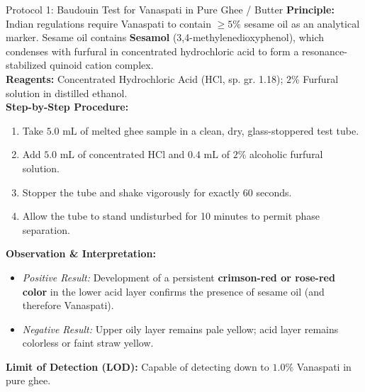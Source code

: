 \documentclass[11pt,a4paper,oneside]{article}
\begin{document}
\begin{protocolbox}{Protocol 1: Baudouin Test for Vanaspati in Pure Ghee / Butter}
\textbf{Principle:} Indian regulations require Vanaspati to contain $\ge 5\%$ sesame oil as an analytical marker. Sesame oil contains \textbf{Sesamol} (3,4-methylenedioxyphenol), which condenses with furfural in concentrated hydrochloric acid to form a resonance-stabilized quinoid cation complex.\\
\textbf{Reagents:} Concentrated Hydrochloric Acid ($\mathrm{HCl}$, sp. gr. 1.18); $2\%$ Furfural solution in distilled ethanol.\\
\textbf{Step-by-Step Procedure:}
\begin{enumerate}
    \item Take $5.0\text{ mL}$ of melted ghee sample in a clean, dry, glass-stoppered test tube.
    \item Add $5.0\text{ mL}$ of concentrated $\mathrm{HCl}$ and $0.4\text{ mL}$ of $2\%$ alcoholic furfural solution.
    \item Stopper the tube and shake vigorously for exactly 60 seconds.
    \item Allow the tube to stand undisturbed for 10 minutes to permit phase separation.
\end{enumerate}
\textbf{Observation \& Interpretation:}
\begin{itemize}
    \item \textit{Positive Result:} Development of a persistent \textbf{crimson-red or rose-red color} in the lower acid layer confirms the presence of sesame oil (and therefore Vanaspati).
    \item \textit{Negative Result:} Upper oily layer remains pale yellow; acid layer remains colorless or faint straw yellow.
\end{itemize}
\textbf{Limit of Detection (LOD):} Capable of detecting down to $1.0\%$ Vanaspati in pure ghee.
\end{protocolbox}
\end{document}
